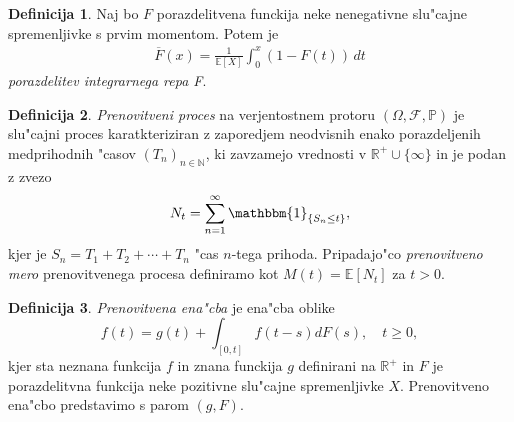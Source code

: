 \documentclass[12pt, a4paper, reqno]{amsart}
\theoremstyle{definition}
\newtheorem{definicija}{Definicija}[section]
\theoremstyle{plain}
\newcommand{\R}{\mathbb{R}}
\newcommand{\N}{\mathbb{N}}
\newcommand{\E}{\mathbb{E}}
\newcommand{\Prob}{\mathbb{P}}
\newcommand{\1}{\mathds{1}}
\begin{document}
    \begin{definicija}
        Naj bo $F$ porazdelitvena funckija neke nenegativne slu"cajne spremenljivke s prvim 
        momentom. Potem je 
        \begin{align*}
            \overline{F}(x) = \frac{1}{\mathbb{E}[X]} \int_0^x (1 - F(t)) \, dt
        \end{align*}
        \textit{porazdelitev integrarnega repa F}.
        \label{def:porazdelitevintegriranegaRepa}
    \end{definicija}

    \begin{definicija}
        \textit{Prenovitveni proces} na verjentostnem protoru $(\Omega, \mathcal{F}, \Prob)$ je slu"cajni 
        proces
        karatkteriziran z zaporedjem neodvisnih enako porazdeljenih medprihodnih "casov $(T_n)_{n\in\N}$, 
        ki zavzamejo vrednosti v $\R^+\cup\{\infty\}$ in je podan z zvezo 
        \begin{equation*}
            N_t = \sum_{n=1}^{\infty}\mathbbm{1}_{\{S_n\leq t\}},
        \end{equation*}
        kjer je $S_n = T_1 + T_2 + \cdots + T_n$ "cas $n$-tega prihoda. Pripadajo"co 
        \textit{prenovitveno mero} prenovitvenega procesa definiramo kot $M(t) = \E\left[N_t\right]$ za 
        $t > 0$.
        \label{def:PrenovitveniProces}
    \end{definicija}

    \begin{definicija}
        \textit{Prenovitvena ena"cba} je ena"cba oblike 
        \begin{equation*}
            f(t) = g(t) + \int_{[0, t]}f(t - s)dF(s), \quad t\geq 0,
        \end{equation*}
        kjer sta neznana funkcija $f$ in znana funckija $g$ definirani na $\R^+$ in $F$ je 
        porazdelitvna funkcija neke pozitivne slu"cajne spremenljivke $X$. Prenovitveno ena"cbo predstavimo
        s parom $(g, F)$.
        \label{def:prenovitvenaEnacba}
    \end{definicija}
\end{document}

